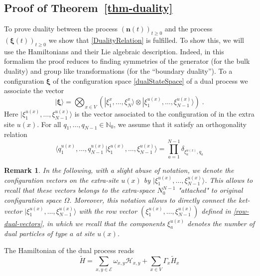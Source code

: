 \documentclass[10pt]{article}
\numberwithin{equation}{section}
\numberwithin{equation}{subsection}
\newtheorem{remark}{Remark}
\newcommand{\dt}{\;.}
\begin{document}
\subsection{Proof of Theorem~\ref{thm-duality}}
\label{proof-th-duality}
To prove duality between the process $(\bm{n}(t))_{t\geq 0}$ and the process  $(\bm{\xi}(t))_{t\geq 0}$ we  show that \eqref{DualityRelation} is fulfilled.  To show this, we will use the Hamiltonians and their Lie algebraic description. Indeed, in this formalism the proof
reduces to finding symmetries of the generator (for the bulk duality) and group like transformations (for the ``boundary duality'').
To a configuration $\bm{\xi}$ of the configuration space  \eqref{dualStateSpace} of a dual process we associate the vector
\begin{equation}
    |\bm{\xi}\rangle=\bigotimes_{x\in V}\left(|\xi_{1}^{x},\ldots,\xi_{N}^{x}\rangle\otimes |\xi_{1}^{u(x)},\ldots,\xi_{N-1}^{u(x)}\rangle\right)\dt
\end{equation}
{\color{blue} Here $|\xi_{1}^{u(x)},\ldots,\xi_{N-1}^{u(x)}\rangle$ is the vector associated to the configuration of in the extra site $u(x)$.  For all $q_{1},\ldots,q_{N-1}\in \mathbb{N}_{0}$, we assume that it satisfy an orthogonality relation
\begin{equation}\label{ortho-extraSite}
	\langle q_{1}^{u(x)},\ldots,q^{u(x)}_{N-1}|\xi_{1}^{u(x)},\ldots,\xi_{N-1}^{u(x)}\rangle=\prod_{a=1}^{N-1}\delta_{\xi_{a}^{u(x)},q_{a}}
\end{equation} }
{\color{blue} \begin{remark}\label{reamrk-extraSite}
	In the following, with a slight abuse of notation, we denote the configuration vectors on the extra-site $u(x)$ by $|\xi_{1}^{u(x)},\ldots,\xi_{N-1}^{u(x)}\rangle$. This allows to recall that these vectors belongs to the extra-space $N_{0}^{N-1}$ "attached" to original configuration space $\Omega$. Moreover, this notation allows to directly connect the ket-vector $|\xi_{1}^{u(x)},\ldots,\xi_{N-1}^{u(x)}\rangle$ with the row vector $(\xi_{1}^{u(x)},\ldots,\xi_{N-1}^{u(x)})$ defined in \eqref{row-dual-vectors}, in which we recall that the components $\xi_{a}^{u(x)}$ denotes the number of dual particles of type $a$ at site $u(x)$.
\end{remark}}
The Hamiltonian of the dual process reads
\begin{equation}\label{DualHamiltonian}
    \widetilde{H}=\sum_{x,y\in \mathcal{E}}\omega_{x,y}\mathcal{H}_{x,y}+\sum_{x\in V}\Gamma_{x}\widetilde{H}_{x}
\end{equation}
\end{document}
